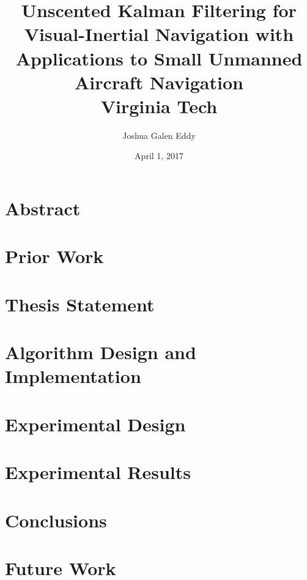 \documentclass[11 pt]{report}
\begin{document}
\title{
	{Unscented Kalman Filtering for Visual-Inertial Navigation with Applications to Small Unmanned Aircraft Navigation}\\
	\vspace{1 em}
	{\Large Virginia Tech}
}
\author{Joshua Galen Eddy}
\date{April 1, 2017}

\maketitle

\chapter*{Abstract}



\tableofcontents
\listoffigures
\listoftables



\chapter{Prior Work}

\chapter{Thesis Statement}

\chapter{Algorithm Design and Implementation}

\chapter{Experimental Design}

\chapter{Experimental Results}

\chapter{Conclusions}

\chapter{Future Work}

\appendix

\clearpage
{}
\end{document}
